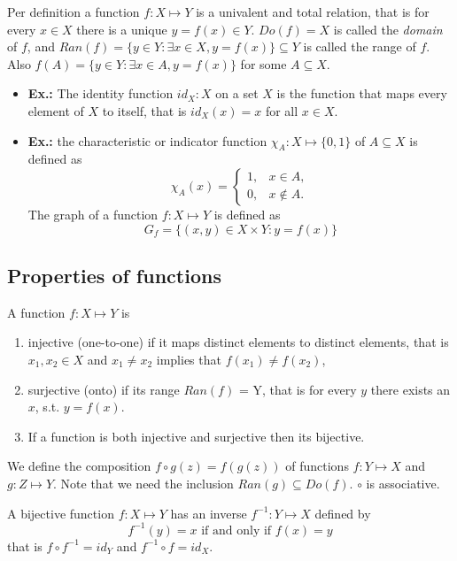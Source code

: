 \documentclass{article}
\begin{document}
Per definition a function $f: X\mapsto Y$ is a univalent and total relation, that is for every $x\in X$ there is a unique $y = f(x)\in Y$. $Do(f) = X$ is called the \textit{domain} of $f$, and $Ran(f) = \{y \in Y: \exists x \in X, y = f(x)\}\subseteq Y$ is called the range of $f$. Also $f(A) = \{y\in Y:\exists x\in A, y = f(x)\}$ for some $A\subseteq X$.

\begin{itemize}
\item \textbf{Ex.:} The identity function $id_X:X$ on a set $X$ is the function that maps every element of $X$ to itself, that is $id_X(x) = x$ for all $x\in X$.

\item \textbf{Ex.:} the characteristic or indicator function $\chi_A:X\mapsto \{0, 1\}$ of $A\subseteq X$ is defined as
\[
\chi_{A}(x) =
\begin{cases}
1, & x \in A,\\
0, & x \notin A.
\end{cases}
\]
The graph of a function $f: X\mapsto Y$ is defined as
\[
G_f= \{(x, y)\in X\times Y:y = f(x)\}
\]
\end{itemize}

\subsection{Properties of functions}

A function $f: X\mapsto Y$ is
\begin{enumerate}
    \item injective (one-to-one) if it maps distinct elements to distinct elements, that is $x_1, x_2\in X$ and $x_1\neq x_2$ implies that $f(x_1)\neq f(x_2)$,
    \item surjective (onto) if its range $Ran(f)$ = Y, that is for every $y$ there exists an $x$, s.t. $y=f(x)$.
    \item If a function is both injective and surjective then its bijective.
\end{enumerate}

We define the composition $f\circ g(z) = f(g(z))$ of functions $f: Y\mapsto X$ and $g: Z\mapsto Y$. Note that we need the inclusion $Ran(g)\subseteq Do(f)$. $\circ$ is associative.

A bijective function $f: X\mapsto Y$ has an inverse $f^{-1}: Y\mapsto X$ defined by
\[
f^{-1}(y) = x \text{ if and only if } f(x) = y
\]
   that is $f\circ f^{-1} = id_Y$ and $f^{-1}\circ f = id_X$.
   
\end{document}
